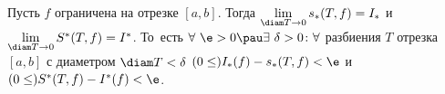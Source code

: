 \label{don2}
 	Пусть $f$ ограничена на отрезке $[a,b]$. Тогда \(\lim\limits_{\diam T\to 0}s_*(T,f) = I_*\) и \(\lim\limits_{\diam T\to 0}S^*(T,f) = I^*\). То~есть
 	$\forall\  \e>0\pau \exists\ \delta>0\colon
 	\forall$ разбиения  $T$ отрезка $[a,b]$ с диаметром $\diam T<\delta$\quad
 	$(0\leq)I_*(f)-s_*(T,f)<\e$ и ${(0\leq)S^*(T,f)-I^*(f)<\e}$.
 
